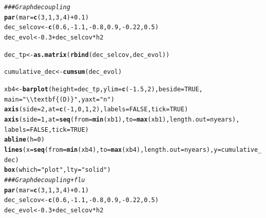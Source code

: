\documentclass{article}\usepackage[]{graphicx}\usepackage[]{color}
\makeatletter
\newcommand{\hlnum}[1]{\textcolor[rgb]{0.686,0.059,0.569}{#1}}%
\newcommand{\hlstr}[1]{\textcolor[rgb]{0.192,0.494,0.8}{#1}}%
\newcommand{\hlcom}[1]{\textcolor[rgb]{0.678,0.584,0.686}{\textit{#1}}}%
\newcommand{\hlopt}[1]{\textcolor[rgb]{0,0,0}{#1}}%
\newcommand{\hlstd}[1]{\textcolor[rgb]{0.345,0.345,0.345}{#1}}%
\newcommand{\hlkwb}[1]{\textcolor[rgb]{0.69,0.353,0.396}{#1}}%
\newcommand{\hlkwc}[1]{\textcolor[rgb]{0.333,0.667,0.333}{#1}}%
\newcommand{\hlkwd}[1]{\textcolor[rgb]{0.737,0.353,0.396}{\textbf{#1}}}%
\newenvironment{kframe}{%
 \def\at@end@of@kframe{}%
 \ifinner\ifhmode%
  \def\at@end@of@kframe{\end{minipage}}%
  \begin{minipage}{\columnwidth}%
 \fi\fi%
 \def\FrameCommand##1{\hskip\@totalleftmargin \hskip-\fboxsep
 \colorbox{shadecolor}{##1}\hskip-\fboxsep
     \hskip-\linewidth \hskip-\@totalleftmargin \hskip\columnwidth}%
 \MakeFramed {\advance\hsize-\width
   \@totalleftmargin\z@ \linewidth\hsize
   \@setminipage}}%
 {\par\unskip\endMakeFramed%
 \at@end@of@kframe}
\newenvironment{knitrout}{}{} %
\makeatother
\begin{document}
\begin{knitrout}
\begin{kframe}
\begin{alltt}
\hlcom{### Graph decoupling }
\hlkwd{par}\hlstd{(}\hlkwc{mar}\hlstd{=}\hlkwd{c}\hlstd{(}\hlnum{3}\hlstd{,} \hlnum{1}\hlstd{,} \hlnum{3}\hlstd{,} \hlnum{4}\hlstd{)} \hlopt{+} \hlnum{0.1}\hlstd{)}
\hlstd{dec_selcov} \hlkwb{<-} \hlkwd{c}\hlstd{(}\hlnum{0.6}\hlstd{,}\hlopt{-}\hlnum{1.1}\hlstd{,}\hlopt{-}\hlnum{0.8}\hlstd{,}\hlnum{0.9}\hlstd{,}\hlopt{-}\hlnum{0.22}\hlstd{,}\hlnum{0.5}\hlstd{)}
\hlstd{dec_evol} \hlkwb{<-} \hlnum{0.3}\hlopt{+}\hlstd{dec_selcov} \hlopt{*} \hlstd{h2}

\hlstd{dec_tp} \hlkwb{<-} \hlkwd{as.matrix}\hlstd{(}\hlkwd{rbind}\hlstd{(dec_selcov, dec_evol))}

\hlstd{cumulative_dec} \hlkwb{<-} \hlkwd{cumsum}\hlstd{(dec_evol)}

\hlstd{xb4} \hlkwb{<-} \hlkwd{barplot}\hlstd{(}\hlkwc{height} \hlstd{= dec_tp,} \hlkwc{ylim} \hlstd{=} \hlkwd{c}\hlstd{(}\hlopt{-}\hlnum{1.5}\hlstd{,}\hlnum{2}\hlstd{),} \hlkwc{beside} \hlstd{=} \hlnum{TRUE}\hlstd{,}
               \hlkwc{main}\hlstd{=}\hlstr{"\textbackslash{}\textbackslash{}textbf\{(D)\}"}\hlstd{,} \hlkwc{yaxt}\hlstd{=}\hlstr{"n"}\hlstd{)}
\hlkwd{axis}\hlstd{(}\hlkwc{side}\hlstd{=}\hlnum{2}\hlstd{,} \hlkwc{at} \hlstd{=} \hlkwd{c}\hlstd{(}\hlopt{-}\hlnum{1}\hlstd{,}\hlnum{0}\hlstd{,}\hlnum{1}\hlstd{,}\hlnum{2}\hlstd{),} \hlkwc{labels} \hlstd{=} \hlnum{FALSE}\hlstd{,} \hlkwc{tick} \hlstd{=} \hlnum{TRUE}\hlstd{)}
\hlkwd{axis}\hlstd{(}\hlkwc{side}\hlstd{=}\hlnum{1}\hlstd{,} \hlkwc{at} \hlstd{=} \hlkwd{seq}\hlstd{(}\hlkwc{from}\hlstd{=}\hlkwd{min}\hlstd{(xb1),} \hlkwc{to}\hlstd{=}\hlkwd{max}\hlstd{(xb1),} \hlkwc{length.out} \hlstd{= nyears),}
     \hlkwc{labels} \hlstd{=} \hlnum{FALSE}\hlstd{,}\hlkwc{tick} \hlstd{=} \hlnum{TRUE}\hlstd{)}
\hlkwd{abline}\hlstd{(}\hlkwc{h}\hlstd{=}\hlnum{0}\hlstd{)}
\hlkwd{lines}\hlstd{(}\hlkwc{x}\hlstd{=}\hlkwd{seq}\hlstd{(}\hlkwc{from}\hlstd{=}\hlkwd{min}\hlstd{(xb4),} \hlkwc{to}\hlstd{=}\hlkwd{max}\hlstd{(xb4),} \hlkwc{length.out} \hlstd{= nyears),} \hlkwc{y}\hlstd{=cumulative_dec)}
\hlkwd{box}\hlstd{(}\hlkwc{which} \hlstd{=} \hlstr{"plot"}\hlstd{,} \hlkwc{lty} \hlstd{=} \hlstr{"solid"}\hlstd{)}
\hlcom{### Graph decoupling + flu}
\hlkwd{par}\hlstd{(}\hlkwc{mar}\hlstd{=}\hlkwd{c}\hlstd{(}\hlnum{3}\hlstd{,} \hlnum{1}\hlstd{,} \hlnum{3}\hlstd{,} \hlnum{4}\hlstd{)} \hlopt{+} \hlnum{0.1}\hlstd{)}
\hlstd{dec_selcov} \hlkwb{<-} \hlkwd{c}\hlstd{(}\hlnum{0.6}\hlstd{,}\hlopt{-}\hlnum{1.1}\hlstd{,}\hlopt{-}\hlnum{0.8}\hlstd{,}\hlnum{0.9}\hlstd{,}\hlopt{-}\hlnum{0.22}\hlstd{,}\hlnum{0.5}\hlstd{)}
\hlstd{dec_evol} \hlkwb{<-} \hlnum{0.3}\hlopt{+}\hlstd{dec_selcov} \hlopt{*} \hlstd{h2}


\end{alltt}
\end{kframe}
\end{knitrout}
\end{document}
